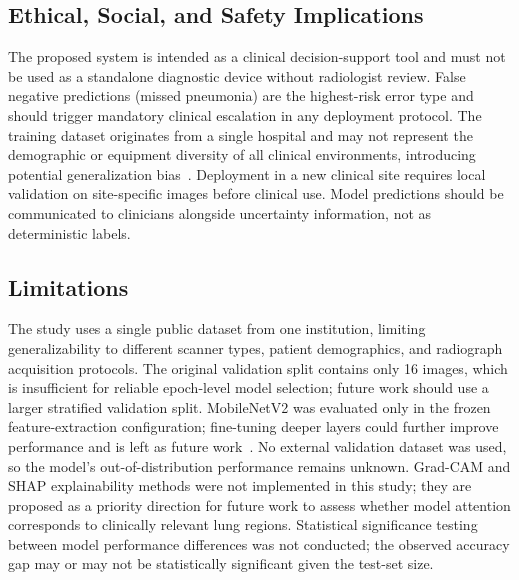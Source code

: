\documentclass[preprint,12pt]{elsarticle}
\begin{document}
\subsection{Ethical, Social, and Safety Implications}
The proposed system is intended as a clinical decision-support tool
and must not be used as a standalone diagnostic device without
radiologist review.
False negative predictions (missed pneumonia) are the highest-risk
error type and should trigger mandatory clinical escalation in any
deployment protocol.
The training dataset originates from a single hospital and may not
represent the demographic or equipment diversity of all clinical
environments, introducing potential generalization bias~\cite{kermany2018}.
Deployment in a new clinical site requires local validation on
site-specific images before clinical use.
Model predictions should be communicated to clinicians alongside
uncertainty information, not as deterministic labels.

\subsection{Limitations}
The study uses a single public dataset from one institution, limiting
generalizability to different scanner types, patient demographics, and
radiograph acquisition protocols.
The original validation split contains only 16 images, which is
insufficient for reliable epoch-level model selection; future work
should use a larger stratified validation split.
MobileNetV2 was evaluated only in the frozen feature-extraction
configuration; fine-tuning deeper layers could further improve
performance and is left as future work~\cite{mobilenetv2}.
No external validation dataset was used, so the model's out-of-distribution
performance remains unknown.
Grad-CAM and SHAP explainability methods were not implemented in this
study; they are proposed as a priority direction for future work to
assess whether model attention corresponds to clinically relevant lung
regions.
Statistical significance testing between model performance differences
was not conducted; the observed accuracy gap may or may not be
statistically significant given the test-set size.

\end{document}
